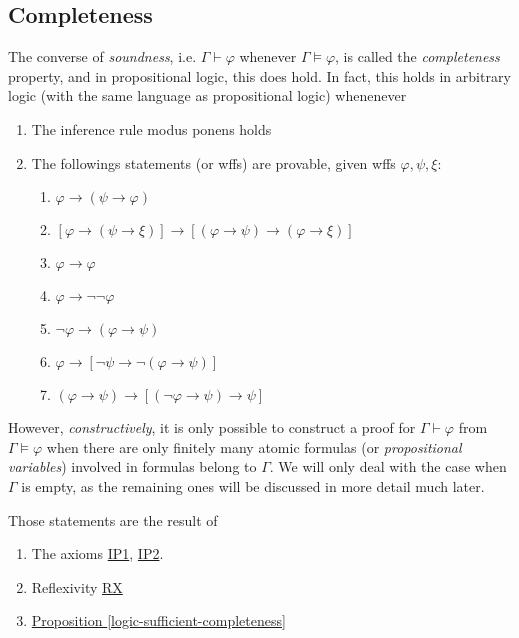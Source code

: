 \documentclass{treatise}
\begin{document}
\subsection{Completeness}
The converse of \emph{soundness}, i.e. $\Gamma \vdash \varphi$ whenever $\Gamma \vDash \varphi$, is called the \emph{completeness} property, and in propositional logic, this does hold. In fact, this holds in arbitrary logic (with the same language as propositional logic) whenenever
\begin{enumerate}
    \item The inference rule modus ponens holds
    \item The followings statements (or wffs) are provable, given wffs $\varphi, \psi, \xi$:
    \begin{enumerate}
        \item $\varphi \to (\psi \to \varphi)$
        \item $[\varphi \to (\psi \to \xi)] \to [(\varphi \to \psi) \to (\varphi \to \xi)]$
        \item $\varphi \to \varphi$
        \item $\varphi \to \neg \neg \varphi$
        \item $\neg \varphi \to (\varphi \to \psi)$
        \item $\varphi \to [\neg \psi \to \neg (\varphi \to \psi)]$
        \item $(\varphi \to \psi) \to [(\neg \varphi \to \psi) \to \psi]$
    \end{enumerate}
\end{enumerate}
However, \textit{constructively}, it is only possible to construct a proof for $\Gamma \vdash \varphi$ from $\Gamma \vDash \varphi$ when there are only finitely many atomic formulas (or \emph{propositional variables}) involved in formulas belong to $\Gamma$. We will only deal with the case when $\Gamma$ is empty, as the remaining ones will be discussed in more detail much later.
\begin{remark}
Those statements are the result of
\begin{enumerate}
    \item The axioms \hyperref[HPL-A-IP1]{IP1}, \hyperref[HPL-A-IP2]{IP2}.
    \item Reflexivity \hyperref[HPL-T-RX]{RX}
    \item \hyperref[logic-sufficient-completeness]{Proposition \ref*{logic-sufficient-completeness}}
\end{enumerate}
\end{remark}
\end{document}
